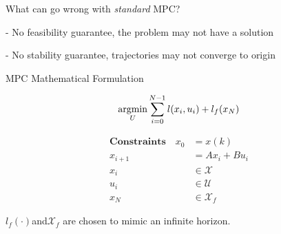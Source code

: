 

What can go wrong with \textit{standard} MPC?

- No feasibility guarantee, the problem may not have a solution

- No stability guarantee, trajectories may not converge to  origin

\begin{sstTitleBox}{
		MPC Mathematical Formulation
	}
	\begin{sstOnlyFrame}
		\begin{equation}
			\underset U{\operatorname{argmin}}
			\sum_{i=0}^{N-1} l(x_i,u_i) + l_f(x_N)
			\label{mpc:nominal}
		\end{equation}

		\vspace{-3mm}
		\begin{minipage}[t]{0.67\linewidth}
			\begin{align*}
				\textbf{Constraints}
				\quad
				x_0     & = x(k)            \\
				x_{i+1} & =Ax_i + Bu_i      \\
				x_{i}   & \in \mathcal{X}   \\
				u_i     & \in \mathcal{U}   \\
				x_N     & \in \mathcal{X}_f
			\end{align*}
		\end{minipage}

		$l_f(\cdot) $and$ \mathcal{X}_f$
		are chosen to mimic an infinite horizon.
	\end{sstOnlyFrame}
\end{sstTitleBox}


